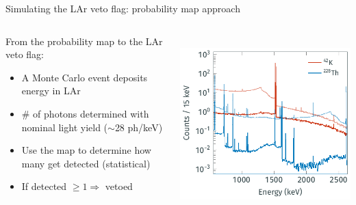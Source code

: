 \documentclass[10pt,aspectratio=169]{beamer}
\begin{document}
\begin{frame}{Simulating the LAr veto flag: probability map approach}
  \begin{columns}
    \begin{column}{0.45\textwidth}
      From the probability map to the LAr veto flag:
      \begin{itemize}
        \item A Monte Carlo event deposits energy in LAr
        \item \# of photons determined with nominal light yield ($\sim$28
          ph/keV)
        \item Use the map to determine how many get detected
          (statistical)
        \item If detected $\geq 1 \Rightarrow$ vetoed
      \end{itemize}
    \end{column}
    \begin{column}{0.55\textwidth}
      \centering
      \vspace*{0.5cm} \\
      \includegraphics{plots/bkg/lar/pdfs-example.pdf}
    \end{column}
  \end{columns}
\end{frame}
\end{document}
